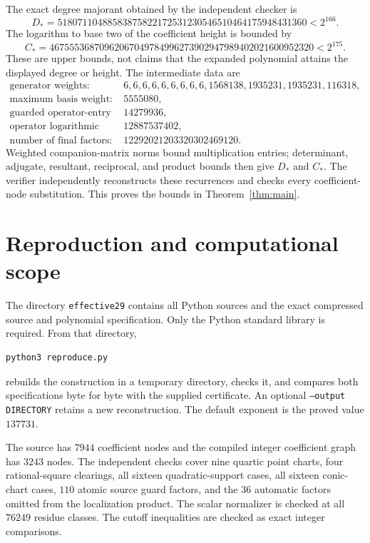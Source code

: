 \documentclass[11pt,a4paper]{article}
\begin{document}
The exact degree majorant obtained by the independent checker is
\[
 D_* =51807110488583875822172531230546510464175948431360
       <2^{166}.
\]
The logarithm to base two of the coefficient height is bounded by
\[
 C_* =46755536870962067049784996273902947989402021600952320
       <2^{175}.
\]
These are upper bounds, not claims that the expanded polynomial
attains the displayed degree or height. The intermediate data are
\[
 \begin{aligned}
 \text{generator weights: }&
 6,6,6,6,6,6,6,6,6,1568138,1935231,1935231,116318,\\
 \text{maximum basis weight: }&5555080,\\
 \text{guarded operator-entry degree: }&14279936,\\
 \text{operator logarithmic norm bound: }&12887537402,\\
 \text{number of final factors: }&12292021203320302469120.
 \end{aligned}
\]
Weighted companion-matrix norms bound multiplication entries;
determinant, adjugate, resultant, reciprocal, and product bounds
then give $D_*$ and $C_*$. The verifier independently reconstructs
these recurrences and checks every coefficient-node substitution.
This proves the bounds in Theorem~\ref{thm:main}.

\section{Reproduction and computational scope}

The directory \texttt{effective29} contains all Python sources
and the exact compressed source and polynomial specification.
Only the Python standard library is required. From that directory,
\begin{verbatim}
python3 reproduce.py
\end{verbatim}
rebuilds the construction in a temporary directory, checks it,
and compares both specifications byte for byte with the supplied
certificate. An optional \texttt{--output DIRECTORY} retains a
new reconstruction. The default exponent is the proved value
$137731$.

The source has $7944$ coefficient nodes and the compiled
integer coefficient graph has $3243$ nodes. The independent
checks cover nine quartic point charts, four rational-square
clearings, all sixteen quadratic-support cases, all sixteen
conic-chart cases, $110$ atomic source guard factors, and the
$36$ automatic factors omitted from the localization product.
The scalar normalizer is checked at all $76249$ residue classes.
The cutoff inequalities are checked as exact integer comparisons.
\end{document}
